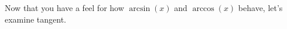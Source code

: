 \documentclass{ximera}
\begin{document}
\begin{example}
\begin{explanation}
  \end{explanation}
\end{example}


Now that you have a feel for how $\arcsin(x)$ and $\arccos(x)$ behave, let's examine tangent.
\end{document}
